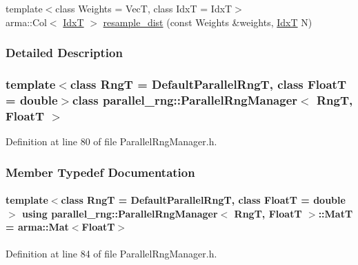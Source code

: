 \begin{DoxyCompactItemize}
\item 
{\footnotesize template$<$class Weights  = Vec\-T, class Idx\-T  = Idx\-T$>$ }\\arma\-::\-Col$<$ \hyperlink{namespaceparallel__rng_aa22fa3e339aee5927780aac099dfc6f3}{Idx\-T} $>$ \hyperlink{classparallel__rng_1_1ParallelRngManager_a6251dc0cbf866e03d568b7b0e1896681}{resample\-\_\-dist} (const Weights \&weights, \hyperlink{namespaceparallel__rng_aa22fa3e339aee5927780aac099dfc6f3}{Idx\-T} N)
\end{DoxyCompactItemize}


\subsubsection{Detailed Description}
\subsubsection*{template$<$class Rng\-T = Default\-Parallel\-Rng\-T, class Float\-T = double$>$class parallel\-\_\-rng\-::\-Parallel\-Rng\-Manager$<$ Rng\-T, Float\-T $>$}



Definition at line 80 of file Parallel\-Rng\-Manager.\-h.



\subsubsection{Member Typedef Documentation}
\hypertarget{classparallel__rng_1_1ParallelRngManager_af73ca29a72b66f92794f435a6163770d}{
\paragraph[{Mat\-T}]{\setlength{\rightskip}{0pt plus 5cm}template$<$class Rng\-T  = Default\-Parallel\-Rng\-T, class Float\-T  = double$>$ using {\bf parallel\-\_\-rng\-::\-Parallel\-Rng\-Manager}$<$ Rng\-T, Float\-T $>$\-::{\bf Mat\-T} =  arma\-::\-Mat$<$Float\-T$>$}}\label{classparallel__rng_1_1ParallelRngManager_af73ca29a72b66f92794f435a6163770d}


Definition at line 84 of file Parallel\-Rng\-Manager.\-h.

